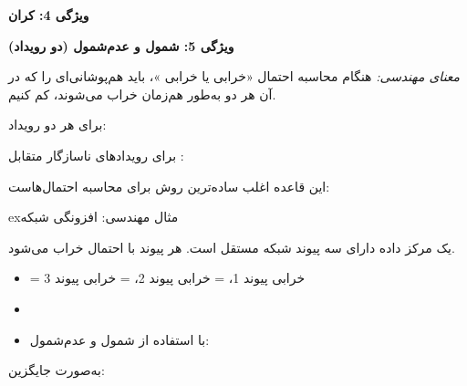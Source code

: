 \textbf{ویژگی 4: کران}

\textbf{ویژگی 5: شمول و عدم‌شمول (دو رویداد)}

\emph{معنای مهندسی:} هنگام محاسبه احتمال «خرابی  یا خرابی »، باید هم‌پوشانی‌ای را که در آن هر دو به‌طور هم‌زمان خراب می‌شوند، کم کنیم.



برای هر دو رویداد:

برای رویدادهای ناسازگار متقابل :



این قاعده اغلب ساده‌ترین روش برای محاسبه احتمال‌هاست:

\begin{PSquote}


\end{PSquote}



\begin{PSbox}[unbreakable]{ex}{مثال مهندسی: افزونگی شبکه}

یک مرکز داده دارای سه پیوند شبکه مستقل است. هر پیوند با احتمال  خراب می‌شود.

\begin{itemize}
\tightlist
\item
   = خرابی پیوند 1،  = خرابی پیوند 2،  = خرابی پیوند 3
\item
\item
  با استفاده از شمول و عدم‌شمول:
\end{itemize}


به‌صورت جایگزین: 

\end{PSbox}

